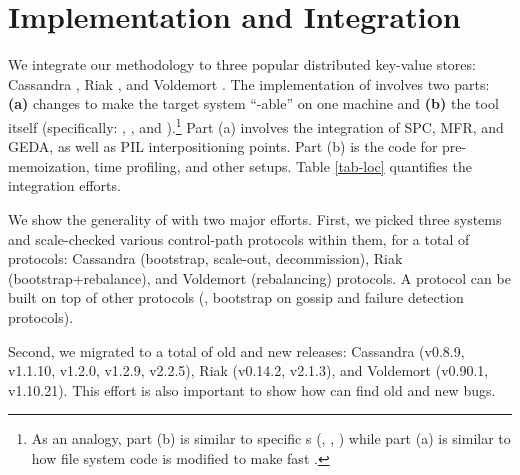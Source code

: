 

\section{Implementation and Integration}
\label{sec-impl}









We integrate our \sck methodology to three popular distributed key-value
stores: Cassandra \cite{Lakshman+09-Cassandra}, Riak \cite{RiakWeb}, and
Voldemort \cite{VoldemortWeb}.
%
The implementation of \sck involves two parts:
%
{\bf (a)} changes to make the target system ``\sck-able'' on one machine and
%
{\bf (b)} the  tool itself (specifically: \scass, \svold, and
\sriak).\footnote{As an analogy, part (b) is similar to specific s
  (\eg, , ) while part (a) is
  similar to how file system code is modified to make 
  fast \cite{Henson+06-Chunkfs, Ma+13-Ffsck}.}
Part (a) involves
the integration of SPC, MFR, and GEDA, as well as PIL interpositioning
points.  Part (b) is the code for pre-memoization, time profiling, and
other  setups.
%
Table \ref{tab-loc} quantifies the integration efforts.  
%

 We show the generality of \sck with two major efforts.
First, we picked three systems and scale-checked various control-path
protocols within them, for a total of \numProt protocols:
%
\numProtCass Cassandra (bootstrap, scale-out, decommission),
%
\numProtRiak Riak (bootstrap+rebalance), and 
%
\numProtVold Voldemort (rebalancing) protocols.
%
A protocol can be built on top of other protocols (\eg, bootstrap on
gossip and failure detection protocols).


Second, we migrated \sck to a total of \numVers old and new releases:
%
\numVersCass Cassandra (v0.8.9, v1.1.10, v1.2.0, v1.2.9, v2.2.5),
%
\numVersRiak Riak (v0.14.2, v2.1.3), and
%
\numVersVold Voldemort (v0.90.1, v1.10.21).
%
This effort is also important to show how \sck can find old and new
bugs. 



